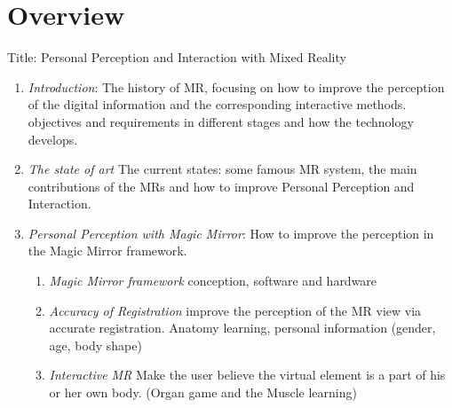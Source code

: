 %
\section*{Overview}
\label{sec:methods}

Title: Personal Perception and Interaction with Mixed Reality

\begin{enumerate}
	\item
		\emph{Introduction}: The history of MR, focusing on how to improve the perception of the digital information and the corresponding interactive methods. objectives and requirements in different stages and how the technology develops.
	\item	
		\emph{The state of art} The current states: some famous MR system, the main contributions of the MRs and how to improve Personal Perception and Interaction. 
	
	\item
		\emph{Personal Perception with Magic Mirror}: How to improve the perception in the Magic Mirror framework.
		\begin{enumerate}
		\item	\emph{Magic Mirror framework} conception, software and hardware
		\item	\emph{Accuracy of Registration} improve the perception of the MR view via accurate registration. Anatomy learning, personal information (gender, age, body shape)
		\item	\emph{Interactive MR} Make the user believe the virtual element is a part of his or her own body. (Organ game and the Muscle learning)
		\end{enumerate}
	

\end{enumerate}
